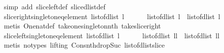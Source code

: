 \begin{isabellebody}
%
\isadelimproof
%
\endisadelimproof
%
\isatagproof
{}\isamarkupfalse%
\ {\isacharparenleft}simp\ add{\isacharcolon}\ slice{\isacharunderscore}left{\isacharunderscore}def\ slice{\isacharunderscore}dlist{\isacharunderscore}def\ {\isacharparenright}%
\endisatagproof
{\isafoldproof}%
%
\isadelimproof
\isanewline
%
\endisadelimproof
\isanewline
{}\isamarkupfalse%
\ slice{\isacharunderscore}right{\isacharunderscore}singleton{\isacharunderscore}eq{\isacharunderscore}element{\isacharcolon}\ {\isachardoublequoteopen}list{\isacharunderscore}of{\isacharunderscore}dlist\ l\ {\isasymnoteq}\ {\isacharbrackleft}{\isacharbrackright}\ {\isasymLongrightarrow}\ \isanewline
\ \ list{\isacharunderscore}of{\isacharunderscore}dlist\ {\isacharparenleft}l{\isasymdagger}{\isachardot}{\isachardot}{}{\isacharparenright}\ {\isacharequal}\ {\isacharbrackleft}{\isacharparenleft}list{\isacharunderscore}of{\isacharunderscore}dlist\ l{\isacharparenright}{\isacharbang}{}{\isacharbrackright}{\isachardoublequoteclose}\isanewline
%
\isadelimproof
%
\endisadelimproof
%
\isatagproof
{}\isamarkupfalse%
\ {\isacharparenleft}metis\ One{\isacharunderscore}nat{\isacharunderscore}def\ take{\isacharunderscore}one{\isacharunderscore}singleton{\isacharunderscore}nth\ take{\isacharunderscore}slice{\isacharunderscore}right{\isacharparenright}%
\endisatagproof
{\isafoldproof}%
%
\isadelimproof
\isanewline
%
\endisadelimproof
\isanewline
{}\isamarkupfalse%
\ slice{\isacharunderscore}left{\isacharunderscore}singleton{\isacharunderscore}eq{\isacharunderscore}element{\isacharcolon}\ {\isachardoublequoteopen}list{\isacharunderscore}of{\isacharunderscore}dlist\ l\ {\isasymnoteq}\ {\isacharbrackleft}{\isacharbrackright}\ {\isasymLongrightarrow}\ \isanewline
\ \ list{\isacharunderscore}of{\isacharunderscore}dlist\ {\isacharparenleft}l{\isasymdagger}{\isacharparenleft}{\isacharparenleft}{\isacharhash}l{\isacharparenright}{\isacharminus}{}{\isacharparenright}{\isachardot}{\isachardot}{\isacharparenright}\ {\isacharequal}\ {\isacharbrackleft}{\isacharparenleft}list{\isacharunderscore}of{\isacharunderscore}dlist\ l{\isacharparenright}{\isacharbang}{\isacharparenleft}{\isacharparenleft}{\isacharhash}l{\isacharparenright}{\isacharminus}{}{\isacharparenright}{\isacharbrackright}{\isachardoublequoteclose}\isanewline
%
\isadelimproof
%
\endisadelimproof
%
\isatagproof
{}\isamarkupfalse%
\ {\isacharparenleft}metis\ {\isacharparenleft}no{\isacharunderscore}types{\isacharcomma}\ lifting{\isacharparenright}\ Cons{\isacharunderscore}nth{\isacharunderscore}drop{\isacharunderscore}Suc\ list{\isacharunderscore}of{\isacharunderscore}dlist{\isacharunderscore}slice\ \isanewline

\end{isabellebody}

